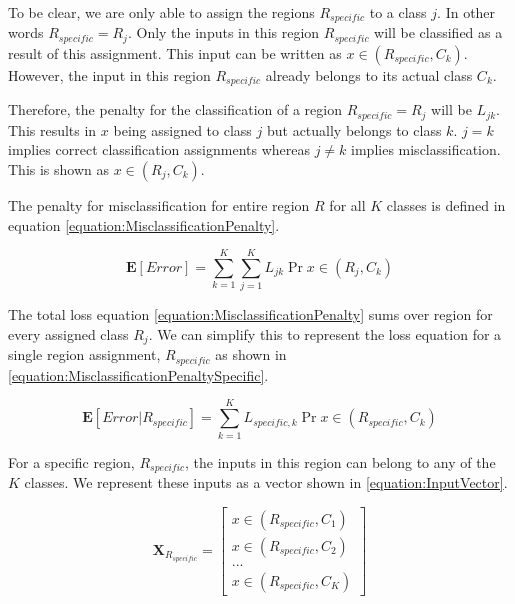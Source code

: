 \documentclass[a4paper,12pt]{article}
\begin{document}
To be clear, we are only able to assign the regions $R_{specific}$ to a class $j$. In other words $R_{specific} = R_{j}$. Only the inputs in this region $R_{specific}$ will be classified as a result of this assignment. This input can be written as $x \in (R_{specific}, C_{k})$. However, the input in this region $R_{specific}$ already belongs to its actual class $C_{k}$.

Therefore, the penalty for the classification of a region $R_{specific} = R_{j}$ will be $L_{jk}$. This results in $x$ being assigned to class $j$ but actually belongs to class $k$. $j=k$ implies correct classification assignments whereas $j \neq k$ implies misclassification. This is shown as $x \in (R_{j}, C_{k})$. 

The penalty for misclassification for entire region $R$ for all $K$ classes is defined in equation \ref{equation:MisclassificationPenalty}. 

\begin{equation}
\label{equation:MisclassificationPenalty}
\mathbf{E}[Error] = \sum_{k=1}^{K} \sum_{j=1}^{K} L_{jk} \Pr{x \in (R_{j}, C_{k})}
\end{equation}

The total loss equation \ref{equation:MisclassificationPenalty} sums over region for every assigned class $R_{j}$. We can simplify this to represent the loss equation for a single region assignment, $R_{specific}$ as shown in \ref{equation:MisclassificationPenaltySpecific}.

\begin{equation}
\label{equation:MisclassificationPenaltySpecific}
\mathbf{E}[Error | R_{specific}]  = \sum_{k=1}^{K} L_{specific,k} \Pr{x \in (R_{specific}, C_{k})}
\end{equation}

For a specific region, $R_{specific}$, the inputs in this region can belong to any of the $K$ classes. We represent these inputs as a vector shown in \ref{equation:InputVector}. 

\begin{equation}
\label{equation:InputVector}
\mathbf{X}_{R_{specific}} =
  \begin{bmatrix}
    x \in (R_{specific}, C_{1}) \\
    x \in (R_{specific}, C_{2})  \\
    ... \\
    x \in (R_{specific}, C_{K})  
  \end{bmatrix}
\end{equation}
\end{document}
